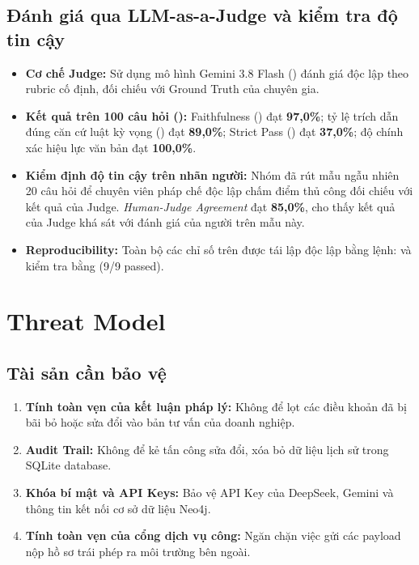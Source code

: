\documentclass[10pt,a4paper]{article}
\begin{document}
\subsection{Đánh giá qua LLM-as-a-Judge và kiểm tra độ tin cậy}
\begin{itemize}
  \item \textbf{Cơ chế Judge:} Sử dụng mô hình Gemini 3.8 Flash () đánh giá độc lập theo rubric cố định, đối chiếu với Ground Truth của chuyên gia.
  \item \textbf{Kết quả trên 100 câu hỏi ():} Faithfulness () đạt \textbf{97{,}0\%}; tỷ lệ trích dẫn đúng căn cứ luật kỳ vọng () đạt \textbf{89{,}0\%}; Strict Pass () đạt \textbf{37{,}0\%}; độ chính xác hiệu lực văn bản đạt \textbf{100{,}0\%}.
  \item \textbf{Kiểm định độ tin cậy trên nhãn người:} Nhóm đã rút mẫu ngẫu nhiên 20 câu hỏi để chuyên viên pháp chế độc lập chấm điểm thủ công đối chiếu với kết quả của Judge. \emph{Human-Judge Agreement} đạt \textbf{85{,}0\%}, cho thấy kết quả của Judge khá sát với đánh giá của người trên mẫu này.
  \item \textbf{Reproducibility:} Toàn bộ các chỉ số trên được tái lập độc lập bằng lệnh:  và kiểm tra bằng  (9/9 passed).
\end{itemize}

\section{Threat Model}

\subsection{Tài sản cần bảo vệ}
\begin{enumerate}
  \item \textbf{Tính toàn vẹn của kết luận pháp lý:} Không để lọt các điều khoản đã bị bãi bỏ hoặc sửa đổi vào bản tư vấn của doanh nghiệp.
  \item \textbf{Audit Trail:} Không để kẻ tấn công sửa đổi, xóa bỏ dữ liệu lịch sử trong SQLite database.
  \item \textbf{Khóa bí mật và API Keys:} Bảo vệ API Key của DeepSeek, Gemini và thông tin kết nối cơ sở dữ liệu Neo4j.
  \item \textbf{Tính toàn vẹn của cổng dịch vụ công:} Ngăn chặn việc gửi các payload nộp hồ sơ trái phép ra môi trường bên ngoài.
\end{enumerate}
\end{document}
